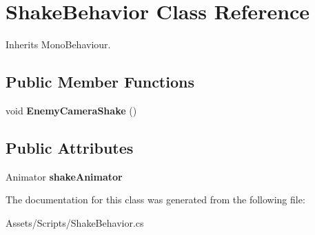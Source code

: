 \hypertarget{class_shake_behavior}{}\section{Shake\+Behavior Class Reference}
\label{class_shake_behavior}


Inherits Mono\+Behaviour.

\subsection*{Public Member Functions}
\begin{DoxyCompactItemize}
\item 
\mbox{\label{class_shake_behavior_aa7d0f4a5ab0a8f566ce5203fe9f4b229}} 
void {\bfseries Enemy\+Camera\+Shake} ()
\end{DoxyCompactItemize}
\subsection*{Public Attributes}
\begin{DoxyCompactItemize}
\item 
\mbox{\label{class_shake_behavior_aae508c1977572a978bd931512057da10}} 
Animator {\bfseries shake\+Animator}
\end{DoxyCompactItemize}


The documentation for this class was generated from the following file\+:\begin{DoxyCompactItemize}
\item 
Assets/\+Scripts/Shake\+Behavior.\+cs\end{DoxyCompactItemize}
